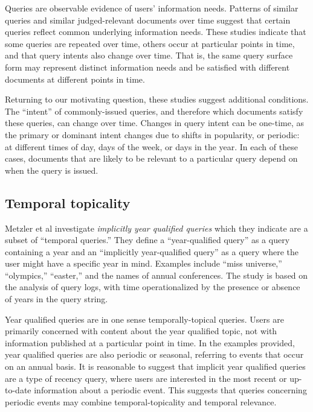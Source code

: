 \documentclass{sig-alternate}
\begin{document}
Queries are observable evidence of users' information needs. Patterns of similar queries and similar judged-relevant documents over time suggest that certain queries reflect common  underlying information needs. These studies indicate that some queries are repeated over time, others occur at particular points in time, and that query intents also change over time.   That is, the same query surface form may represent distinct information needs and be satisfied with different documents at different points in time.

Returning to our motivating question, these studies suggest additional conditions. The ``intent'' of commonly-issued queries, and therefore which documents satisfy these queries, can change over time. Changes in query intent can be one-time, as the primary or dominant intent changes due to shifts in popularity, or periodic: at different times of day, days of the week, or days in the year. In each of these cases, documents that are likely to be relevant to a particular query depend on when the query is issued.


\subsection{Temporal topicality}

Metzler et al \cite{Metzler2009} investigate \emph{implicitly year qualified queries} which they indicate are a subset of ``temporal queries.'' They define a ``year-qualified query'' as a query containing a year and an ``implicitly year-qualified query'' as a query where the user might have a specific year in mind.  Examples include ``miss universe,'' ``olympics,'' ``easter,'' and the names of annual conferences.  The study is based on the analysis of query logs, with time operationalized by the presence or absence of years in the query string. 

Year qualified queries are in one sense temporally-topical queries.  Users are primarily concerned with content about the year qualified topic, not with information published at a particular point in time. In the examples provided, year qualified queries are also periodic or seasonal, referring to events that occur on an annual basis. It is reasonable to suggest that implicit year qualified queries are a type of recency query, where users are interested in the most recent or up-to-date information about a periodic event. This suggests that queries concerning periodic events may combine temporal-topicality and temporal relevance.
\end{document}
